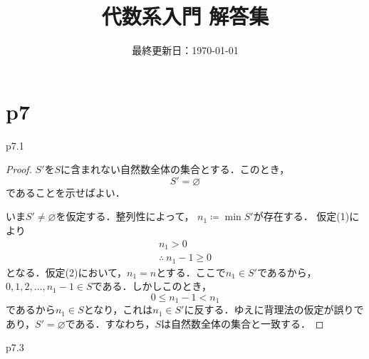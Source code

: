 \documentclass[dvipdfmx,uplatex,11pt]{jsarticle}
\title{代数系入門 解答集}
\author{}
\date{最終更新日：\today}
\theoremstyle{mytheorem}
\begin{document}
\maketitle

\tableofcontents

\newpage


\section{p7}
p7.1
\begin{leftbar}
    \begin{proof}
        $S'$を$S$に含まれない自然数全体の集合とする．このとき，
        \[
            S' = \varnothing
        \]
        であることを示せばよい．

        いま$S' \ne \varnothing$を仮定する．整列性によって， $n_1 \coloneqq \min S' $が存在する．
        仮定(1)により
        \begin{gather*}
            n_1 >0 \\
            \therefore ~ n_1 -1 \ge 0
        \end{gather*}
        となる．仮定(2)において，$n_1 =n$とする．ここで$n_1 \in S'$であるから，$0,1,2,\dots,n_1 -1 \in S$である．しかしこのとき，
        \[
            0 \le n_1 -1 < n_1
        \]
        であるから$n_1 \in S$となり，これは$n_1 \in S'$に反する．ゆえに背理法の仮定が誤りであり，$S' = \varnothing$である．すなわち，$S$は自然数全体の集合と一致する．
    \end{proof}
\end{leftbar}

\newpage 
p7.3 
\end{document}
